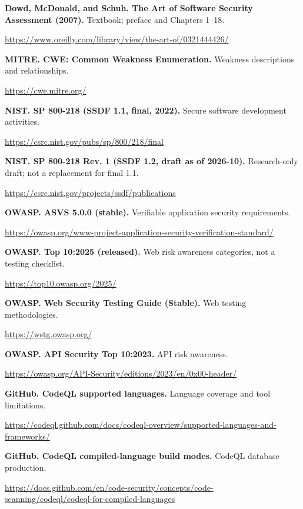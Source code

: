 \documentclass[10pt,letterpaper]{article}
\begin{document}
\noindent\textbf{Dowd, McDonald, and Schuh. The Art of Software Security Assessment (2007).} Textbook; preface and Chapters 1--18.\par\small\url{https://www.oreilly.com/library/view/the-art-of/0321444426/}\par\normalsize\medskip
\noindent\textbf{MITRE. CWE: Common Weakness Enumeration.} Weakness descriptions and relationships.\par\small\url{https://cwe.mitre.org/}\par\normalsize\medskip
\noindent\textbf{NIST. SP 800-218 (SSDF 1.1, final, 2022).} Secure software development activities.\par\small\url{https://csrc.nist.gov/pubs/sp/800/218/final}\par\normalsize\medskip
\noindent\textbf{NIST. SP 800-218 Rev. 1 (SSDF 1.2, draft as of 2026-10).} Research-only draft; not a replacement for final 1.1.\par\small\url{https://csrc.nist.gov/projects/ssdf/publications}\par\normalsize\medskip
\noindent\textbf{OWASP. ASVS 5.0.0 (stable).} Verifiable application security requirements.\par\small\url{https://owasp.org/www-project-application-security-verification-standard/}\par\normalsize\medskip
\noindent\textbf{OWASP. Top 10:2025 (released).} Web risk awareness categories, not a testing checklist.\par\small\url{https://top10.owasp.org/2025/}\par\normalsize\medskip
\noindent\textbf{OWASP. Web Security Testing Guide (Stable).} Web testing methodologies.\par\small\url{https://wstg.owasp.org/}\par\normalsize\medskip
\noindent\textbf{OWASP. API Security Top 10:2023.} API risk awareness.\par\small\url{https://owasp.org/API-Security/editions/2023/en/0x00-header/}\par\normalsize\medskip
\noindent\textbf{GitHub. CodeQL supported languages.} Language coverage and tool limitations.\par\small\url{https://codeql.github.com/docs/codeql-overview/supported-languages-and-frameworks/}\par\normalsize\medskip
\noindent\textbf{GitHub. CodeQL compiled-language build modes.} CodeQL database production.\par\small\url{https://docs.github.com/en/code-security/concepts/code-scanning/codeql/codeql-for-compiled-languages}\par\normalsize\medskip
\end{document}
